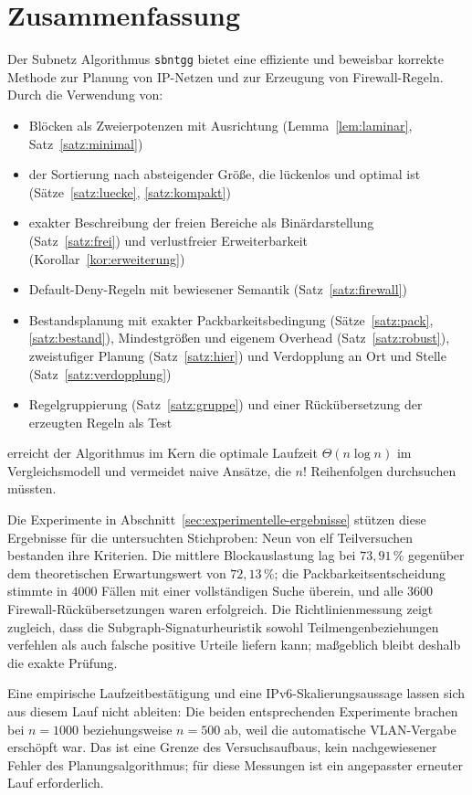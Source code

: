 \documentclass[a4paper,12pt, twoside]{report}
\theoremstyle{definition}
\begin{document}
\chapter{Zusammenfassung}

Der Subnetz Algorithmus \texttt{sbntgg} bietet eine effiziente und beweisbar korrekte Methode zur Planung von IP-Netzen und zur Erzeugung von Firewall-Regeln. Durch die Verwendung von:

\begin{itemize}
	\item Blöcken als Zweierpotenzen mit Ausrichtung (Lemma~\ref{lem:laminar}, Satz~\ref{satz:minimal})
	\item der Sortierung nach absteigender Größe, die lückenlos und optimal ist (Sätze~\ref{satz:luecke}, \ref{satz:kompakt})
	\item exakter Beschreibung der freien Bereiche als Binärdarstellung (Satz~\ref{satz:frei}) und verlustfreier Erweiterbarkeit (Korollar~\ref{kor:erweiterung})
	\item Default-Deny-Regeln mit bewiesener Semantik (Satz~\ref{satz:firewall})
	\item Bestandsplanung mit exakter Packbarkeitsbedingung (Sätze~\ref{satz:pack}, \ref{satz:bestand}), Mindestgrößen und eigenem Overhead (Satz~\ref{satz:robust}), zweistufiger Planung (Satz~\ref{satz:hier}) und Verdopplung an Ort und Stelle (Satz~\ref{satz:verdopplung})
	\item Regelgruppierung (Satz~\ref{satz:gruppe}) und einer Rückübersetzung der erzeugten Regeln als Test
\end{itemize}

erreicht der Algorithmus im Kern die optimale Laufzeit $\Theta(n\log n)$ im Vergleichsmodell und vermeidet naive Ansätze, die $n!$ Reihenfolgen durchsuchen müssten.

Die Experimente in Abschnitt~\ref{sec:experimentelle-ergebnisse} stützen diese Ergebnisse für die untersuchten Stichproben: Neun von elf Teilversuchen bestanden ihre Kriterien. Die mittlere Blockauslastung lag bei $73{,}91\,\%$ gegenüber dem theoretischen Erwartungswert von $72{,}13\,\%$; die Packbarkeitsentscheidung stimmte in $4000$ Fällen mit einer vollständigen Suche überein, und alle $3600$ Firewall-Rückübersetzungen waren erfolgreich. Die Richtlinienmessung zeigt zugleich, dass die Subgraph-Signaturheuristik sowohl Teilmengenbeziehungen verfehlen als auch falsche positive Urteile liefern kann; maßgeblich bleibt deshalb die exakte Prüfung.

Eine empirische Laufzeitbestätigung und eine IPv6-Skalierungsaussage lassen sich aus diesem Lauf nicht ableiten: Die beiden entsprechenden Experimente brachen bei $n=1000$ beziehungsweise $n=500$ ab, weil die automatische VLAN-Vergabe erschöpft war. Das ist eine Grenze des Versuchsaufbaus, kein nachgewiesener Fehler des Planungsalgorithmus; für diese Messungen ist ein angepasster erneuter Lauf erforderlich.
\end{document}
